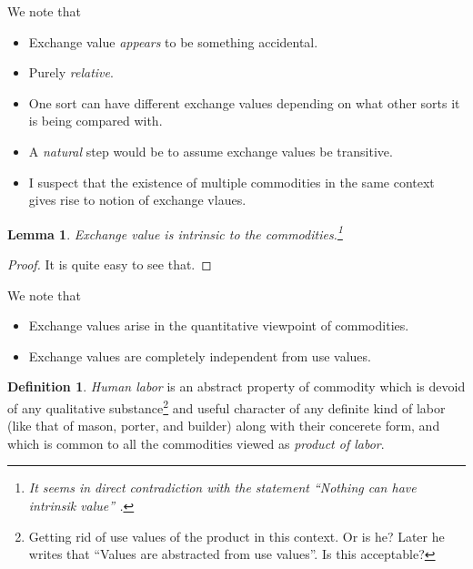 \documentclass[12pt]{extarticle}
\newtheorem{lemma}[theorem]{Lemma}
\theoremstyle{definition}
\newtheorem{definition}{Definition}[section]
\newenvironment{remark}[1][Remark]{\begin{trivlist}
\item[\hskip \labelsep {\bfseries #1}]}{\end{trivlist}}
\begin{document}
  \begin{remark}
    We note that
    \begin{itemize}
    \item Exchange value \emph{appears} to be something accidental.
    \item Purely \emph{relative}.
    \item One sort can have different exchange values depending on what other sorts it is being compared with.
    \item A \emph{natural} step would be to assume exchange values be transitive.
      \item I suspect that the existence of multiple commodities in the same context gives rise to notion of exchange vlaues.
    \end{itemize}
    \end{remark}

    \begin{lemma}
      \label{lemma:exval}
      Exchange value is intrinsic to the commodities.\footnote{It seems in direct contradiction with the statement ``Nothing can have intrinsik value'' \cite{Barbon:777}.}
    \end{lemma}

    \begin{proof}
      It is quite easy to see that.
      \end{proof}

      \begin{remark}
        We note that
        \begin{itemize}
        \item Exchange values arise in the quantitative viewpoint of commodities.
          \item Exchange values are completely independent from use values.
          \end{itemize}
        \end{remark}

        \begin{definition}
          \emph{Human labor} is an abstract property of commodity which is devoid of any qualitative substance\footnote{Getting rid of use values of the product in this context.  Or is he?  Later he writes that ``Values are abstracted from use values''.  Is this acceptable?} and useful character of any definite kind of labor (like that of mason, porter, and builder) along with their concerete form, and which is common to all the commodities viewed as \emph{product of labor}.
        \end{definition}
\end{document}
